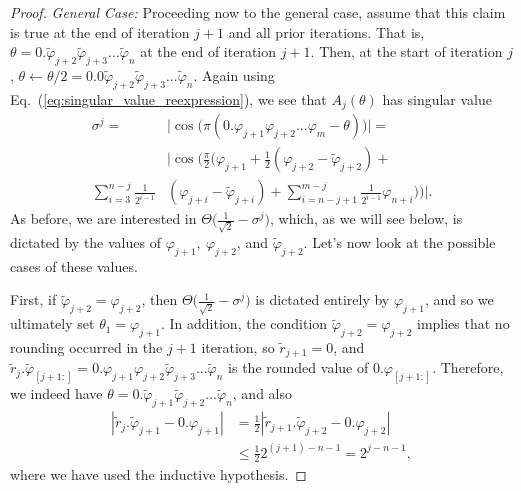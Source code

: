 \documentclass[aps,pra,showpacs,notitlepage,twocolumn,superscriptaddress,nofootinbib]{revtex4-1}
\begin{document}
\begin{proof}
\textit{General Case:} Proceeding now to the general case, assume that this claim is true at the end of iteration $j+1$ and all prior iterations. That is, $\theta = 0.\tilde{\varphi}_{j+2}\tilde{\varphi}_{j+3}...\tilde{\varphi}_n$ at the end of iteration $j+1$. Then, at the start of iteration $j$, $\theta \leftarrow \theta/2 = 0.0\tilde{\varphi}_{j+2} \tilde{\varphi}_{j+3} ... \tilde{\varphi}_n$. Again using Eq.~(\ref{eq:singular_value_reexpression}), we see that $A_j(\theta)$ has singular value
\begin{equation}
\begin{split}
    \sigma^{j} =& \big|\cos\big(\pi (0.\varphi_{j+1}\varphi_{j+2}...\varphi_{m}-\theta) \big) \big|= \\ 
    &\Bigg| \cos\Bigg( \frac{\pi}{2}\Big(\varphi_{j+1} + \frac{1}{2}(\varphi_{j+2}-\tilde{\varphi}_{j+2})+ \\ 
    \sum_{i=3}^{n-j} \frac{1}{2^{i-1}}& (\varphi_{j+i}-\tilde{\varphi}_{j+i}) + \sum_{i=n-j+1}^{m-j} \frac{1}{2^{i-1}} \varphi_{n+i} \Big) \Bigg) \Bigg|.
\end{split}
\end{equation}
As before, we are interested in $\Theta \big(\frac{1}{\sqrt{2}} - \sigma^j \big)$, which, as we will see below, is dictated by the values of $\varphi_{j+1}, \ \varphi_{j+2}$, and $\tilde{\varphi}_{j+2}$. Let's now look at the possible cases of these values.

First, if $\tilde{\varphi}_{j+2} =\varphi_{j+2}$, then $\Theta\big(\frac{1}{\sqrt{2}}- \sigma^j \big)$ is dictated entirely by $\varphi_{j+1}$, and so we ultimately set $\theta_1 = \varphi_{j+1}$. In addition, the condition $\tilde{\varphi}_{j+2} =\varphi_{j+2}$ implies that no rounding occurred in the $j+1$ iteration, so $\tilde{r}_{j+1} = 0$, and $\tilde{r}_j.\tilde{\varphi}_{[j+1:]} = 0.\varphi_{j+1}\varphi_{j+2}\tilde{\varphi}_{j+3} ... \tilde{\varphi}_n$ is the rounded value of $0.\varphi_{[j+1:]}$. Therefore, we indeed have $\theta = 0.\tilde{\varphi}_{j+1} \tilde{\varphi}_{j+2} ... \tilde{\varphi}_{n}$, and also 
\begin{equation}
\begin{split}
    |\tilde{r}_j . \tilde{\varphi}_{j+1} - 0.\varphi_{j+1}| &= \frac{1}{2}|\tilde{r}_{j+1}.\tilde{\varphi}_{j+2} - 0.\varphi_{j+2}| \\ &\leq \frac{1}{2}2^{(j+1)-n-1} = 2^{j-n-1},
\end{split}
\end{equation}
where we have used the inductive hypothesis. 



\end{proof}
\end{document}
